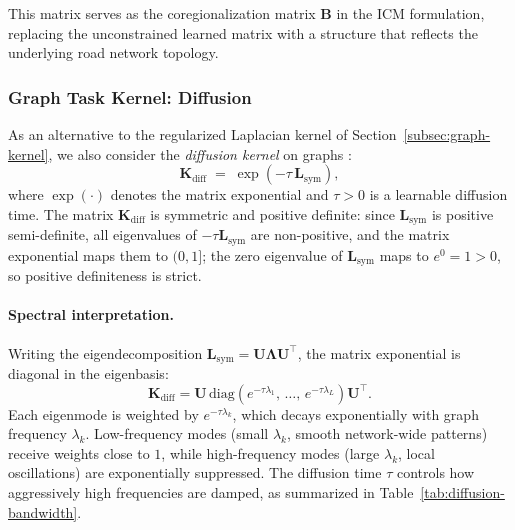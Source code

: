 \documentclass[11pt]{article}
\begin{document}
This matrix serves as the coregionalization matrix $\mathbf{B}$ in the ICM
formulation, replacing the unconstrained learned matrix with a structure that
reflects the underlying road network topology.


\subsubsection{Graph Task Kernel: Diffusion}
\label{subsec:diffusion-kernel}

As an alternative to the regularized Laplacian kernel of
Section~\ref{subsec:graph-kernel}, we also consider the \emph{diffusion
kernel} on graphs \parencite{kondor2002diffusion}:
\begin{equation}
    \mathbf{K}_{\mathrm{diff}}
    \;=\;
    \exp\!\left(-\tau\, \mathbf{L}_{\mathrm{sym}}\right),
    \label{eq:diffusion-kernel}
\end{equation}
where $\exp(\cdot)$ denotes the matrix exponential and $\tau > 0$ is a
learnable diffusion time. The matrix $\mathbf{K}_{\mathrm{diff}}$ is
symmetric and positive definite: since $\mathbf{L}_{\mathrm{sym}}$ is
positive semi-definite, all eigenvalues of
$-\tau\mathbf{L}_{\mathrm{sym}}$ are non-positive, and the matrix
exponential maps them to $(0,1]$; the zero eigenvalue of
$\mathbf{L}_{\mathrm{sym}}$ maps to $e^{0}=1>0$, so positive
definiteness is strict.

\paragraph{Spectral interpretation.}
Writing the eigendecomposition
$\mathbf{L}_{\mathrm{sym}} = \mathbf{U}\boldsymbol{\Lambda}\mathbf{U}^\top$,
the matrix exponential is diagonal in the eigenbasis:
\begin{equation}
    \mathbf{K}_{\mathrm{diff}}
    = \mathbf{U}
      \,\mathrm{diag}\!\left(e^{-\tau\lambda_1},\,\dots,\,
      e^{-\tau\lambda_L}\right)
      \mathbf{U}^\top.
    \label{eq:diffusion-kernel-spectral}
\end{equation}
Each eigenmode is weighted by $e^{-\tau\lambda_k}$, which decays
exponentially with graph frequency $\lambda_k$. Low-frequency modes
(small $\lambda_k$, smooth network-wide patterns) receive weights close
to $1$, while high-frequency modes (large $\lambda_k$, local
oscillations) are exponentially suppressed. The diffusion time $\tau$
controls how aggressively high frequencies are damped, as summarized in
Table~\ref{tab:diffusion-bandwidth}.
\end{document}

